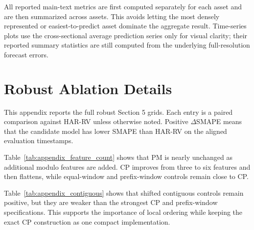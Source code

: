 \documentclass[a4paper]{article}
\begin{document}
\noindent
All reported main-text metrics are first computed separately for each asset and are then summarized across assets. This avoids letting the most densely represented or easiest-to-predict asset dominate the aggregate result. Time-series plots use the cross-sectional average prediction series only for visual clarity; their reported summary statistics are still computed from the underlying full-resolution forecast errors.

\section{Robust Ablation Details}

\noindent
This appendix reports the full robust Section 5 grids. Each entry is a paired comparison against HAR-RV unless otherwise noted. Positive $\Delta$SMAPE means that the candidate model has lower SMAPE than HAR-RV on the aligned evaluation timestamps.

\clearpage

{\renewcommand{\thetable}{C1}
\begin{center}
\label{tab:appendix_feature_count}
\scriptsize
\renewcommand{\arraystretch}{1.08}
\resizebox{0.86\textwidth}{!}{}
\end{center}}

\noindent
Table~\ref{tab:appendix_feature_count} shows that PM is nearly unchanged as additional modulo features are added. CP improves from three to six features and then flattens, while equal-window and prefix-window controls remain close to CP.

{\renewcommand{\thetable}{C2}
\begin{center}
\label{tab:appendix_contiguous}
\scriptsize
\renewcommand{\arraystretch}{1.08}
\resizebox{0.90\textwidth}{!}{}
\end{center}}

\noindent
Table~\ref{tab:appendix_contiguous} shows that shifted contiguous controls remain positive, but they are weaker than the strongest CP and prefix-window specifications. This supports the importance of local ordering while keeping the exact CP construction as one compact implementation.
\end{document}
